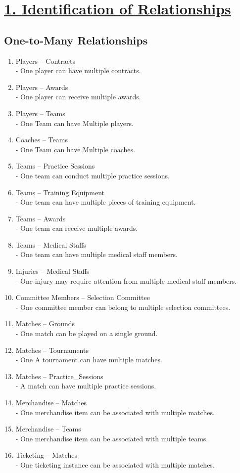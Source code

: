 \documentclass[a4paper, 12pt]{article}
\author{}
\date{}
\begin{document}
\section{\underline{1. Identification of Relationships}}

\subsection{One-to-Many Relationships}

\begin{enumerate}
\item Players – Contracts \\
- One player can have multiple contracts.
\item Players – Awards \\
- One player can receive multiple awards.
\item Players – Teams \\
- One Team can have Multiple players.
\item Coaches – Teams \\
- One Team can have Multiple coaches.
\item Teams – Practice Sessions \\
- One team can conduct multiple practice sessions.
\item Teams – Training Equipment \\
- One team can have multiple pieces of training equipment.
\item Teams – Awards \\
- One team can receive multiple awards.
\item Teams – Medical Staffs \\
- One team can have multiple medical staff members.
\item Injuries – Medical Staffs \\
- One injury may require attention from multiple medical staff members.
\item Committee Members – Selection Committee \\
- One committee member can belong to multiple selection committees.
\item Matches – Grounds \\
- One match can be played on a single ground.
\item Matches – Tournaments \\
- One A tournament can have multiple matches.
\item Matches – Practice\_Sessions \\
- A match can have multiple practice sessions.
\item Merchandise – Matches \\
- One merchandise item can be associated with multiple matches.
\item Merchandise – Teams \\
- One merchandise item can be associated with multiple teams.
\item Ticketing – Matches \\
- One ticketing instance can be associated with multiple matches.
\end{enumerate}
\end{document}
